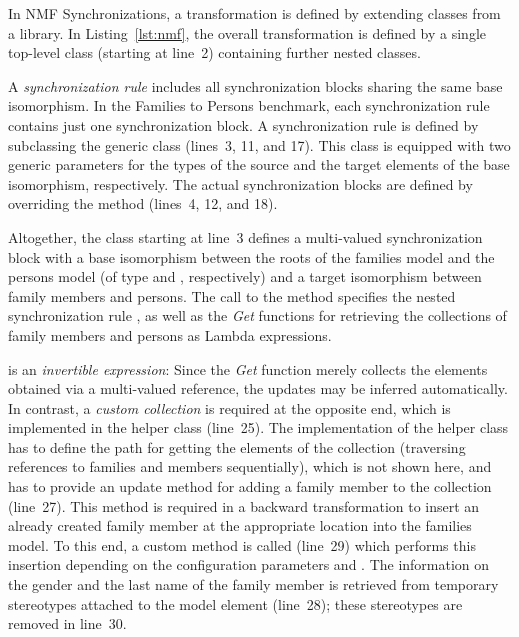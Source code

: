 In NMF Synchronizations, a transformation is defined by extending classes from a library. In Listing~\ref{lst:nmf}, the overall transformation is defined by a single top-level class (starting at line~2) containing further nested classes.

A \emph{synchronization rule} includes all synchronization blocks sharing the same base isomorphism. In the Families to Persons benchmark, each synchronization rule contains just one synchronization block. A synchronization rule is defined by subclassing the generic class  (lines~3, 11, and 17). This class is equipped with two generic parameters for the types of the source and the target elements of the base isomorphism, respectively. The actual synchronization blocks are defined by overriding the method  (lines~4, 12, and 18). 

Altogether, the class starting at line~3 defines a multi-valued synchronization block with a base isomorphism between the roots of the families model and the persons model (of type  and , respectively) and a target isomorphism between family members and persons. The call to the method  specifies the nested synchronization rule , as well as the \emph{Get} functions for retrieving the collections of family members and persons as Lambda expressions. 

 is an \emph{invertible expression}: Since the \emph{Get} function merely collects the elements obtained via a multi-valued reference, the updates may be inferred automatically. In contrast, a \emph{custom collection} is required at the opposite end, which is implemented in the helper class  (line~25). The implementation of the helper class has to define the path for getting the elements of the collection (traversing references to families and members sequentially), which is not shown here, and has to provide an update method for adding a family member to the collection (line~27). This  method is required in a backward transformation to insert an already created family member at the appropriate location into the families model. To this end, a custom method  is called (line~29) which performs this insertion depending on the configuration parameters  and . The information on the gender and the last name of the family member is retrieved from temporary stereotypes attached to the model element (line~28); these stereotypes are removed in line~30.

